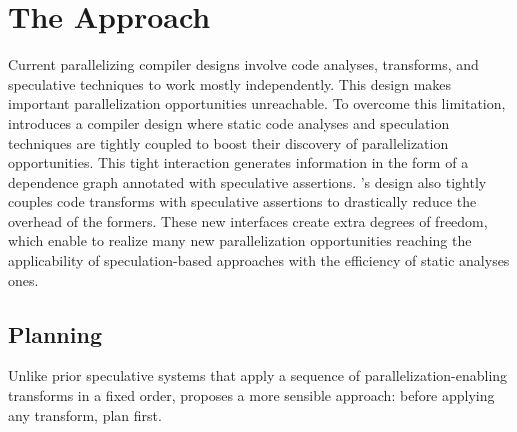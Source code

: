 \section{The \name Approach}
\label{sec:approach}

Current parallelizing compiler designs involve code analyses, transforms,
and speculative techniques to work mostly independently.
This design makes important parallelization opportunities unreachable.
To overcome this limitation, \name introduces a compiler design where static code analyses and speculation techniques are tightly coupled to boost their discovery of parallelization opportunities.
This tight interaction generates information in the form of a dependence graph annotated with speculative assertions.
\namensp's design also tightly couples code transforms with speculative assertions to drastically reduce the overhead of the formers.
These new interfaces create extra degrees of freedom, which enable \name to realize many new parallelization opportunities reaching the applicability of speculation-based approaches with the efficiency of static analyses ones.


\subsection{Planning}
\label{planning}
%
Unlike prior speculative systems that apply a sequence of
parallelization-enabling transforms in a fixed order, \name proposes a
more sensible approach: before applying any transform, plan
first.

